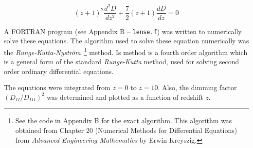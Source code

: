 \documentclass[a4paper]{IEEEtran}
\begin{document}
\begin{equation}
    (z+1)^2 \frac{d^2D}{dz^2} + \frac{7}{2}(z+1)\frac{dD}{dz} = 0
\end{equation}

A FORTRAN program (see Appendix B -- \texttt{lense.f}) was written
to numerically solve these equations. The algorithm used to solve these
equation numerically was the \emph{Runge-Kutta-Nystr\"{o}m}~\footnote{
See the code in Appendix B for the exact algorithm. This algorithm
was obtained from Chapter 20 (Numerical Methods for Differential Equations)
from \emph{Advanced Engineering Mathematics} by Erwin Kreyszig.}
method.  Is method is a fourth order algorithm which is a general form 
of the standard \emph{Runge-Kutta} method, used for solving second order 
ordinary differential equations.

The equations were integrated from $z = 0$ to $z = 10$. 
Also, the dimming factor $(D_{II}/D_{III})^2$ was determined and plotted
as a function of redshift $z$.
\end{document}

